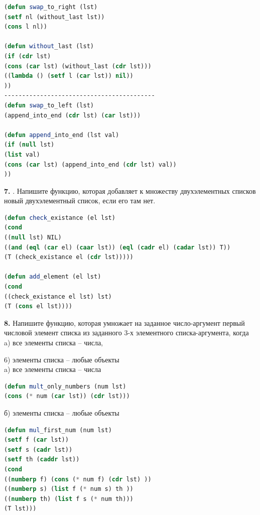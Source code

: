 \documentclass[12pt]{report}
\begin{document}
\begin{lstlisting}[label=third,caption=Решение задания №6, language=lisp]
(defun swap_to_right (lst)
(setf nl (without_last lst))
(cons l nl))

(defun without_last (lst)
(if (cdr lst)
(cons (car lst) (without_last (cdr lst)))
((lambda () (setf l (car lst)) nil))
))
------------------------------------------
(defun swap_to_left (lst)
(append_into_end (cdr lst) (car lst)))

(defun append_into_end (lst val)
(if (null lst)
(list val)
(cons (car lst) (append_into_end (cdr lst) val))
))
\end{lstlisting}
\textbf{7.} . Напишите функцию, которая добавляет к множеству двухэлементных списков новый двухэлементный список, если его там нет.\\

\begin{lstlisting}[label=third,caption=Решение задания №7, language=lisp]
(defun check_existance (el lst)
(cond
((null lst) NIL)
((and (eql (car el) (caar lst)) (eql (cadr el) (cadar lst)) T))
(T (check_existance el (cdr lst)))))

(defun add_element (el lst)
(cond
((check_existance el lst) lst)
(T (cons el lst))))
\end{lstlisting}
\textbf{8.} Напишите функцию, которая умножает на заданное число-аргумент первый числовой
элемент списка из заданного 3-х элементного списка-аргумента, когда\\

a) все элементы списка -- числа,

6) элементы списка -- любые объекты\\

a) все элементы списка -- числа\\
\begin{lstlisting}[label=third,caption=Решение задания №8a, language=lisp]
(defun mult_only_numbers (num lst)
(cons (* num (car lst)) (cdr lst)))
\end{lstlisting}

б) элементы списка -- любые объекты

\begin{lstlisting}[label=third,caption=Решение задания №8б, language=lisp]
(defun mul_first_num (num lst)
(setf f (car lst))
(setf s (cadr lst))
(setf th (caddr lst))
(cond
((numberp f) (cons (* num f) (cdr lst) ))
((numberp s) (list f (* num s) th ))
((numberp th) (list f s (* num th)))
(T lst)))
\end{lstlisting}
\end{document}
